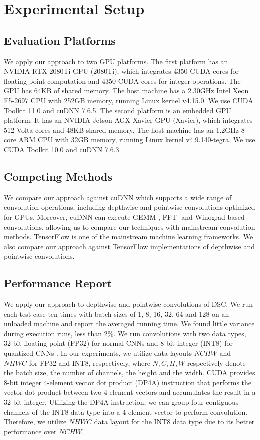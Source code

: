 

\section{Experimental Setup}

\subsection{Evaluation Platforms} We apply our approach to two GPU platforms.
The first platform has an NVIDIA RTX 2080Ti GPU (2080Ti), which integrates 4350 CUDA cores for floating point computation and 4350 CUDA
cores for integer operations. The GPU has 64KB of shared memory. The host machine has a 2.30GHz Intel Xeon E5-2697 CPU with 252GB memory,
running Linux kernel v4.15.0. We use CUDA Toolkit 11.0 and cuDNN 7.6.5. The second platform is an embedded GPU platform. It has an NVIDIA
Jetson AGX Xavier GPU (Xavier), which integrates 512 Volta cores and 48KB shared memory. The host machine has an 1.2GHz 8-core ARM CPU with
32GB memory, running Linux kernel v4.9.140-tegra. We use CUDA Toolkit 10.0 and cuDNN 7.6.3.


\subsection{Competing Methods} We compare our approach against cuDNN \cite{ChetlurWVCTCS14} which supports a wide range of convolution operations,
 including depthwise and pointwise convolutions optimized for GPUs.  Moreover, cuDNN can execute GEMM-, FFT- and Winograd-based convolutions, allowing
 us to compare our techniques with mainstream convolution methods. TensorFlow \cite{abadi2016tensorflow} is one of the mainstream machine learning frameworks. We also compare our approach against TensorFlow implementations of depthwise and pointwise convolutions.


\subsection{Performance Report}
We apply our approach to depthwise and pointwise convolutions of DSC.  We run each test case ten times with batch sizes of 1, 8,
16, 32, 64 and 128 on an unloaded machine and report the averaged running time. We found little variance during execution runs, less than
2\%. We run convolutions with two data types, 32-bit floating point (FP32) for normal CNNs and 8-bit integer (INT8) for quantized CNNs
\cite{nagel2019data}. In our experiments, we utilize data layouts $NCHW$ and $NHWC$ for FP32 and INT8, respectively, where $N, C, H, W$
respectively denote the batch size, the number of channels, the height and the width. CUDA \cite{cudatoolkit} provides 8-bit integer
4-element vector dot product (DP4A) instruction that performs the vector dot product between two 4-element vectors and accumulates the
result in a 32-bit integer. Utilizing the DP4A instruction, we can group four contiguous channels of the INT8 data type into a 4-element
vector to perform convolution. Therefore, we utilize $NHWC$ data layout for the INT8 data type due to its better performance over $NCHW$.

